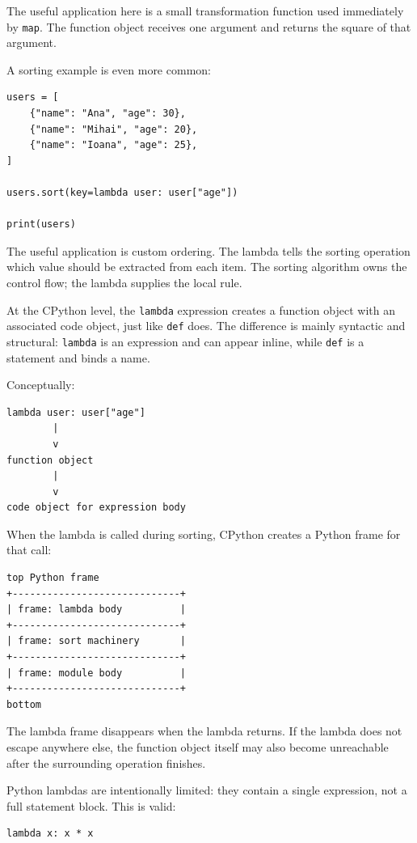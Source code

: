 The useful application here is a small transformation function used immediately by \texttt{map}. The function object receives one argument and returns the square of that argument.

A sorting example is even more common:

\begin{verbatim}
users = [
    {"name": "Ana", "age": 30},
    {"name": "Mihai", "age": 20},
    {"name": "Ioana", "age": 25},
]

users.sort(key=lambda user: user["age"])

print(users)
\end{verbatim}

The useful application is custom ordering. The lambda tells the sorting operation which value should be extracted from each item. The sorting algorithm owns the control flow; the lambda supplies the local rule.

At the CPython level, the \texttt{lambda} expression creates a function object with an associated code object, just like \texttt{def} does. The difference is mainly syntactic and structural: \texttt{lambda} is an expression and can appear inline, while \texttt{def} is a statement and binds a name.

Conceptually:

\begin{verbatim}
lambda user: user["age"]
        |
        v
function object
        |
        v
code object for expression body
\end{verbatim}

When the lambda is called during sorting, CPython creates a Python frame for that call:

\begin{verbatim}
top Python frame
+-----------------------------+
| frame: lambda body          |
+-----------------------------+
| frame: sort machinery       |
+-----------------------------+
| frame: module body          |
+-----------------------------+
bottom
\end{verbatim}

The lambda frame disappears when the lambda returns. If the lambda does not escape anywhere else, the function object itself may also become unreachable after the surrounding operation finishes.

Python lambdas are intentionally limited: they contain a single expression, not a full statement block. This is valid:

\begin{verbatim}
lambda x: x * x
\end{verbatim}


